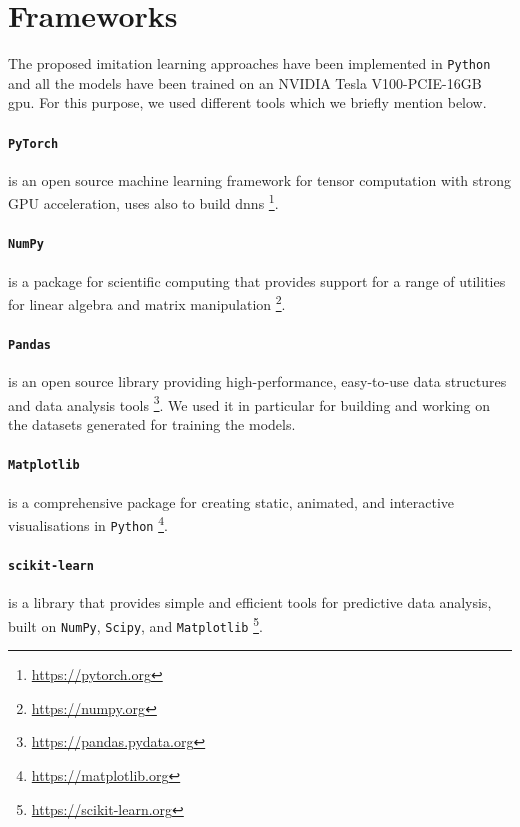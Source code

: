\section{Frameworks}
\label{sec:learning}
The proposed imitation learning approaches have been implemented in 
\texttt{Python} and all the models have been trained on an NVIDIA Tesla 
V100-PCIE-16GB \gls{gpu}.
For this purpose, we used different tools which we briefly mention below.

\paragraph*{\texttt{PyTorch}} is an open source machine learning framework  for 
tensor computation with strong GPU acceleration, uses also to build \glspl{dnn} 
\footnote{\url{https://pytorch.org}}.

\paragraph*{\texttt{NumPy}} is a package for scientific computing that provides 
support for a range of utilities for linear algebra and matrix manipulation 
\footnote{\url{https://numpy.org}}.

\paragraph*{\texttt{Pandas}} is an open source library providing 
high-performance, easy-to-use data structures and data analysis tools 
\footnote{\url{https://pandas.pydata.org}}. We used it in particular for building 
and working on the datasets generated for training the models. 

\paragraph*{\texttt{Matplotlib}} is a comprehensive package for creating 
static, animated, and interactive visualisations in \texttt{Python} 
\footnote{\url{https://matplotlib.org}}. 

\paragraph*{\texttt{scikit-learn}} is a library that provides simple and efficient 
tools for predictive data analysis, built on \texttt{NumPy}, \texttt{Scipy}, and 
\texttt{Matplotlib} \footnote{\url{https://scikit-learn.org}}.



